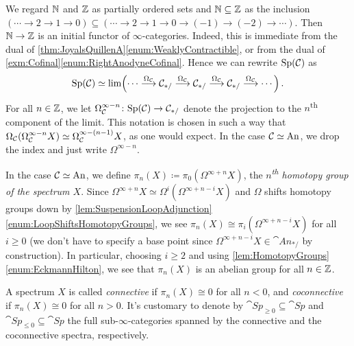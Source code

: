 \begin{con}\label{con:HomotopyGroupsOfSpectra}
	We regard $\mathbb{N}$ and $\mathbb{Z}$ as partially ordered sets and $\mathbb{N}\subseteq \mathbb{Z}$ as the inclusion $(\dotsb\rightarrow 2\rightarrow 1\rightarrow0)\subseteq (\dotsb\rightarrow 2\rightarrow 1 \rightarrow 0\rightarrow (-1)\rightarrow (-2)\rightarrow\dotsb)$. Then $\mathbb{N}\rightarrow \mathbb{Z}$ is an initial functor of $\infty$-categories. Indeed, this is immediate from the dual of \cref{thm:JoyalsQuillenA}\cref{enum:WeaklyContractible}, or from the dual of \cref{exm:Cofinal}\cref{enum:RightAnodyneCofinal}. Hence we can rewrite $\mathrm{Sp}(\mathcal{C})$ as
	\begin{equation*}
		\cat{Sp}(\Cc)\simeq \limit\left(\dotsb\overset{\Omega_\Cc}{\longrightarrow} \Cc_{*/}\overset{\Omega_\Cc}{\longrightarrow} \Cc_{*/}\overset{\Omega_\Cc}{\longrightarrow} \Cc_{*/}\overset{\Omega_\Cc}{\longrightarrow}\dotsb\right)\,.
	\end{equation*}
	For all $n\in\mathbb{Z}$, we let $\Omega_{\mathcal{C}}^{\infty-n}\colon \mathrm{Sp}(\mathcal{C})\rightarrow \mathcal{C}_{*/}$ denote the projection to the $n$\textsuperscript{th} component of the limit. This notation is chosen in such a way that $\Omega_{\mathcal{C}}(\Omega_{\mathcal{C}}^{\infty-n}X)\simeq \Omega_{\mathcal{C}}^{\infty-(n-1)}X$, as one would expect. In the case $\mathcal{C}\simeq \mathrm{An}$, we drop the index and just write $\Omega^{\infty-n}$.
	
	In the case $\mathcal{C}\simeq \mathrm{An}$, we define $\pi_n(X)\coloneqq \pi_0(\Omega^{\infty+n}X)$, the \emph{$n$\textsuperscript{th} homotopy group of the spectrum $X$}. Since $\Omega^{\infty+n}X\simeq \Omega^i(\Omega^{\infty+n-i}X)$ and $\Omega$ shifts homotopy groups down by \cref{lem:SuspensionLoopAdjunction}\cref{enum:LoopShiftsHomotopyGroups}, we see $\pi_n(X)\cong \pi_i(\Omega^{\infty+n-i}X)$ for all $i\geqslant 0$ (we don't have to specify a base point since $\Omega^{\infty+n-i}X\in\cat{An}_{*/}$ by construction). In particular, choosing $i\geqslant 2$ and using \cref{lem:HomotopyGroups}\cref{enum:EckmannHilton}, we see that $\pi_n(X)$ is an abelian group for all $n\in\mathbb{Z}$.
	
	A spectrum $X$ is called \emph{connective} if $\pi_n(X)\cong 0$ for all $n<0$, and \emph{coconnective} if $\pi_n(X)\cong 0$ for all $n>0$. It's customary to denote by $\cat{Sp}_{\geqslant 0}\subseteq \cat{Sp}$ and $\cat{Sp}_{\leqslant 0}\subseteq \cat{Sp}$ the full sub-$\infty$-categories spanned by the connective and the coconnective spectra, respectively.
\end{con}
